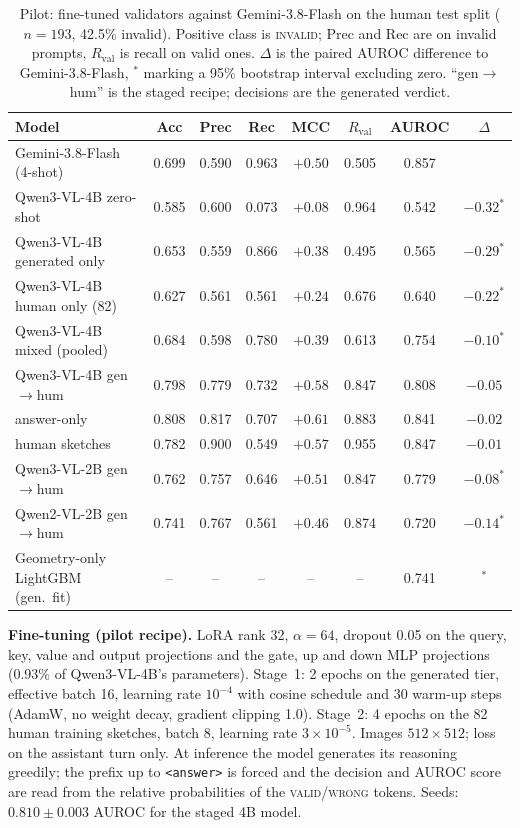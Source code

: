 \documentclass{article} %
\begin{document}
\begin{table}[H]
\caption{Pilot: fine-tuned validators against Gemini-3.8-Flash on the human test split ($n=193$, 42.5\% invalid). Positive class is \textsc{invalid}; Prec and Rec are on invalid prompts, $R_{\mathrm{val}}$ is recall on valid ones. $\Delta$ is the paired AUROC difference to Gemini-3.8-Flash, $^*$ marking a 95\% bootstrap interval excluding zero. ``gen$\to$hum'' is the staged recipe; decisions are the generated verdict.}
\label{tab:pilot}
\begin{center}
\footnotesize
\begin{tabular}{lccccccc}
\toprule
Model & Acc & Prec & Rec & MCC & $R_{\mathrm{val}}$ & AUROC & $\Delta$ \\
\midrule
Gemini-3.8-Flash (4-shot) & 0.699 & 0.590 & 0.963 & $+0.50$ & 0.505 & 0.857 & \\
Qwen3-VL-4B zero-shot & 0.585 & 0.600 & 0.073 & $+0.08$ & 0.964 & 0.542 & $-0.32^*$ \\
Qwen3-VL-4B generated only & 0.653 & 0.559 & 0.866 & $+0.38$ & 0.495 & 0.565 & $-0.29^*$ \\
Qwen3-VL-4B human only (82) & 0.627 & 0.561 & 0.561 & $+0.24$ & 0.676 & 0.640 & $-0.22^*$ \\
Qwen3-VL-4B mixed (pooled) & 0.684 & 0.598 & 0.780 & $+0.39$ & 0.613 & 0.754 & $-0.10^*$ \\
Qwen3-VL-4B gen$\to$hum & 0.798 & 0.779 & 0.732 & $+0.58$ & 0.847 & 0.808 & $-0.05$ \\
\quad answer-only & 0.808 & 0.817 & 0.707 & $+0.61$ & 0.883 & 0.841 & $-0.02$ \\
\quad 40 human sketches & 0.782 & 0.900 & 0.549 & $+0.57$ & 0.955 & 0.847 & $-0.01$ \\
Qwen3-VL-2B gen$\to$hum & 0.762 & 0.757 & 0.646 & $+0.51$ & 0.847 & 0.779 & $-0.08^*$ \\
Qwen2-VL-2B gen$\to$hum & 0.741 & 0.767 & 0.561 & $+0.46$ & 0.874 & 0.720 & $-0.14^*$ \\
\midrule
Geometry-only LightGBM (gen.\ fit) & -- & -- & -- & -- & -- & 0.741 & $^*$ \\
\bottomrule
\end{tabular}
\end{center}
\end{table}

\textbf{Fine-tuning (pilot recipe).} LoRA rank 32, $\alpha=64$, dropout 0.05 on the query, key, value and output projections and the gate, up and down MLP projections (0.93\% of Qwen3-VL-4B's parameters). Stage~1: 2 epochs on the generated tier, effective batch 16, learning rate $10^{-4}$ with cosine schedule and 30 warm-up steps (AdamW, no weight decay, gradient clipping 1.0). Stage~2: 4 epochs on the 82 human training sketches, batch 8, learning rate $3\times10^{-5}$. Images $512{\times}512$; loss on the assistant turn only. At inference the model generates its reasoning greedily; the prefix up to \texttt{<answer>} is forced and the decision and AUROC score are read from the relative probabilities of the \textsc{valid}/\textsc{wrong} tokens. Seeds: $0.810\pm0.003$ AUROC for the staged 4B model.
\end{document}
